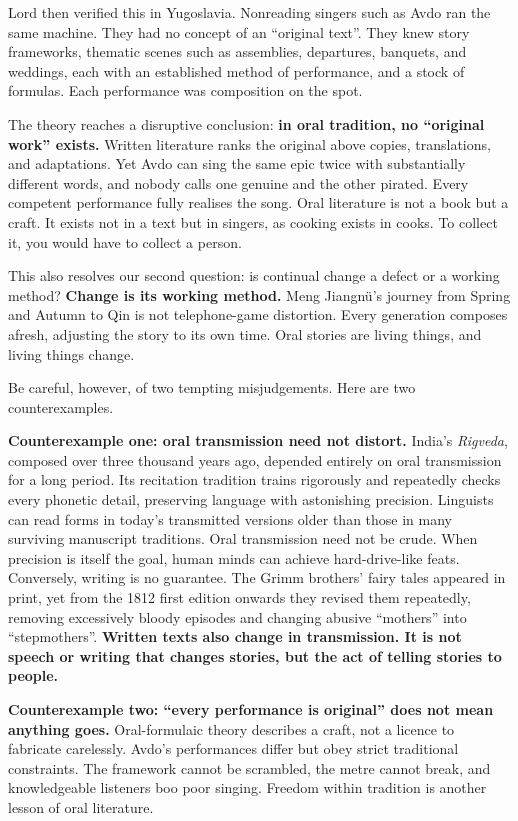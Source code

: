 Lord then verified this in Yugoslavia. Nonreading singers such as Avdo ran the same machine. They had no concept of an ``original text''. They knew story frameworks, thematic scenes such as assemblies, departures, banquets, and weddings, each with an established method of performance, and a stock of formulas. Each performance was composition on the spot.

The theory reaches a disruptive conclusion: \textbf{in oral tradition, no ``original work'' exists.} Written literature ranks the original above copies, translations, and adaptations. Yet Avdo can sing the same epic twice with substantially different words, and nobody calls one genuine and the other pirated. Every competent performance fully realises the song. Oral literature is not a book but a craft. It exists not in a text but in singers, as cooking exists in cooks. To collect it, you would have to collect a person.

This also resolves our second question: is continual change a defect or a working method? \textbf{Change is its working method.} Meng Jiangnü's journey from Spring and Autumn to Qin is not telephone-game distortion. Every generation composes afresh, adjusting the story to its own time. Oral stories are living things, and living things change.

Be careful, however, of two tempting misjudgements. Here are two counterexamples.

\textbf{Counterexample one: oral transmission need not distort.} India's \emph{Rigveda}, composed over three thousand years ago, depended entirely on oral transmission for a long period. Its recitation tradition trains rigorously and repeatedly checks every phonetic detail, preserving language with astonishing precision. Linguists can read forms in today's transmitted versions older than those in many surviving manuscript traditions. Oral transmission need not be crude. When precision is itself the goal, human minds can achieve hard-drive-like feats. Conversely, writing is no guarantee. The Grimm brothers' fairy tales appeared in print, yet from the 1812 first edition onwards they revised them repeatedly, removing excessively bloody episodes and changing abusive ``mothers'' into ``stepmothers''. \textbf{Written texts also change in transmission. It is not speech or writing that changes stories, but the act of telling stories to people.}

\textbf{Counterexample two: ``every performance is original'' does not mean anything goes.} Oral-formulaic theory describes a craft, not a licence to fabricate carelessly. Avdo's performances differ but obey strict traditional constraints. The framework cannot be scrambled, the metre cannot break, and knowledgeable listeners boo poor singing. Freedom within tradition is another lesson of oral literature.

